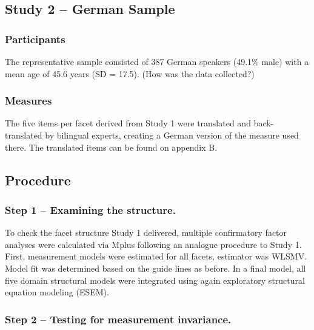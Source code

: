 \documentclass[,man,floatsintext]{apa6}
\theoremstyle{definition}
\theoremstyle{definition}
\theoremstyle{definition}
\theoremstyle{remark}
\begin{document}
\hypertarget{study-2-german-sample}{%
\subsection{Study 2 -- German Sample}\label{study-2-german-sample}}

\hypertarget{participants-1}{%
\subsubsection{Participants}\label{participants-1}}

The representative sample consisted of 387 German speakers (49.1\% male)
with a mean age of 45.6 years (SD = 17.5). (How was the data collected?)

\hypertarget{measures}{%
\subsubsection{Measures}\label{measures}}

The five items per facet derived from Study 1 were translated and
back-translated by bilingual experts, creating a German version of the
measure used there. The translated items can be found on appendix B.

\hypertarget{procedure-1}{%
\subsection{Procedure}\label{procedure-1}}

\hypertarget{step-1-examining-the-structure.}{%
\subsubsection{Step 1 -- Examining the
structure.}\label{step-1-examining-the-structure.}}

To check the facet structure Study 1 delivered, multiple confirmatory
factor analyses were calculated via Mplus following an analogue
procedure to Study 1. First, measurement models were estimated for all
facets, estimator was WLSMV. Model fit was determined based on the guide
lines as before. In a final model, all five domain structural models
were integrated using again exploratory structural equation modeling
(ESEM).

\hypertarget{step-2-testing-for-measurement-invariance.}{%
\subsubsection{Step 2 -- Testing for measurement
invariance.}\label{step-2-testing-for-measurement-invariance.}}
\end{document}
